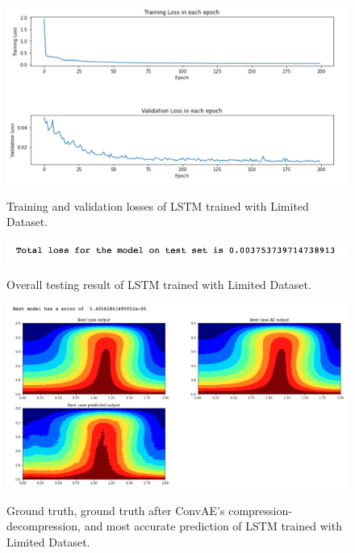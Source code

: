 \begin{figure}[H]
    \caption{Training and validation losses of LSTM trained with Limited Dataset.}
    \includegraphics[scale=0.6]{figures/mantle_convection_images/limited_dataset/LSTM_trainingData.png}
    \label{figure:LSTM_limited_losses}
\end{figure}

\begin{figure}[H]
    \caption{Overall testing result of LSTM trained with Limited Dataset.}
    \includegraphics[scale=0.8]{figures/mantle_convection_images/limited_dataset/LSTM_OverallTesting.png}
    \label{figure:LSTM_limited_testing}
\end{figure}

\begin{figure}[H]
    \caption{Ground truth, ground truth after ConvAE's compression-decompression, and most accurate prediction of LSTM trained with Limited Dataset.}
    \includegraphics[scale=0.5]{figures/mantle_convection_images/limited_dataset/LSTM_Best.png}
    \label{figure:LSTM_limited_best}
\end{figure}

